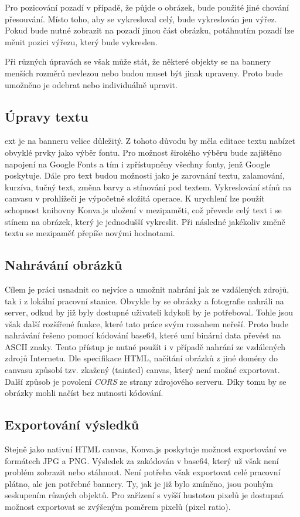         Pro pozicování pozadí v případě, že půjde o obrázek, bude použité jiné chování přesouvání. Místo toho, aby se vykresloval celý, bude vykreslován jen výřez.
        Pokud bude nutné zobrazit na pozadí jinou část obrázku, potáhnutím pozadí lze měnit pozici výřezu, který bude vykreslen.

        Při různých úpravách se však může stát, že některé objekty se na bannery menších rozměrů nevlezou nebo budou muset být jinak upraveny.
        Proto bude umožněno je odebrat nebo individuálně upravit.

        \subsection{Úpravy textu}
        ext je na banneru velice důležitý. Z tohoto důvodu by měla editace textu nabízet obvyklé prvky jako výběr fontu.
        Pro možnost širokého výběru bude zajištěno napojení na Google Fonts a tím i zpřístupněny všechny fonty, jenž Google poskytuje.
        Dále pro text budou možnosti jako je zarovnání textu, zalamování, kurzíva, tučný text, změna barvy a stínování pod textem.
        Vykreslování stínů na canvasu v prohlížeči je výpočetně složitá operace. K urychlení lze použít schopnost knihovny Konva.js uložení v mezipaměti,
        což převede celý text i se stínem na obrázek,
        který je jednodušší vykreslit. Při následné jakékoliv změně textu se mezipaměť přepíše novými hodnotami.

        \subsection{Nahrávání obrázků}
        Cílem je práci usnadnit co nejvíce a umožnit nahrání jak ze vzdálených zdrojů, tak i z lokální pracovní stanice.
        Obvykle by se obrázky a fotografie nahráli na server, odkud by již byly dostupné uživateli kdykoli by je potřeboval.
        Tohle jsou však další rozšířené funkce, které tato práce svým rozsahem neřeší. Proto bude nahrávání řešeno pomocí kódování base64,
        které umí binární data převést na ASCII znaky. Tento přístup je nutné použít i v případě nahrání ze vzdálených zdrojů Internetu.
        Dle specifikace HTML, načítání obrázků z jiné domény do canvasu způsobí tzv. zkažený (tainted) canvas, který není možné exportovat.
        Další způsob je povolení \emph{CORS} ze strany zdrojového serveru. Díky tomu by se obrázky mohli načíst bez nutnosti kódování.

        \subsection{Exportování výsledků}
        Stejně jako nativní HTML canvas, Konva.js poskytuje možnost exportování ve formátech JPG a PNG.
        Výsledek za zakódován v base64, který už však není problém zobrazit nebo stáhnout.
        Není potřeba však exportovat celé pracovní plátno, ale jen potřebné bannery. Ty, jak je již bylo zmíněno,
        jsou pouhým seskupením různých objektů. Pro zařízení s vyšší hustotou pixelů je dostupná možnost exportovat se zvýšeným poměrem pixelů (pixel ratio). 

